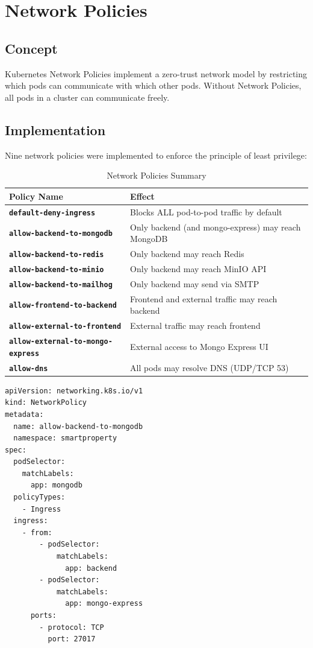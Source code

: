 \documentclass[12pt,a4paper]{report}
\begin{document}
\section{Network Policies}

\subsection{Concept}

Kubernetes Network Policies implement a zero-trust network model by restricting which pods can communicate with which other pods. Without Network Policies, all pods in a cluster can communicate freely.

\subsection{Implementation}

Nine network policies were implemented to enforce the principle of least privilege:

\begin{table}[H]
  \centering
  \begin{tabular}{>{\bfseries}p{5.5cm} p{8cm}}
    \toprule
    \textbf{Policy Name} & \textbf{Effect} \\
    \midrule
    \texttt{default-deny-ingress} & Blocks ALL pod-to-pod traffic by default \\
    \texttt{allow-backend-to-mongodb} & Only backend (and mongo-express) may reach MongoDB \\
    \texttt{allow-backend-to-redis} & Only backend may reach Redis \\
    \texttt{allow-backend-to-minio} & Only backend may reach MinIO API \\
    \texttt{allow-backend-to-mailhog} & Only backend may send via SMTP \\
    \texttt{allow-frontend-to-backend} & Frontend and external traffic may reach backend \\
    \texttt{allow-external-to-frontend} & External traffic may reach frontend \\
    \texttt{allow-external-to-mongo-express} & External access to Mongo Express UI \\
    \texttt{allow-dns} & All pods may resolve DNS (UDP/TCP 53) \\
    \bottomrule
  \end{tabular}
  \caption{Network Policies Summary}
\end{table}

\begin{lstlisting}[style=yamlstyle, caption={Example: MongoDB Network Policy}]
apiVersion: networking.k8s.io/v1
kind: NetworkPolicy
metadata:
  name: allow-backend-to-mongodb
  namespace: smartproperty
spec:
  podSelector:
    matchLabels:
      app: mongodb
  policyTypes:
    - Ingress
  ingress:
    - from:
        - podSelector:
            matchLabels:
              app: backend
        - podSelector:
            matchLabels:
              app: mongo-express
      ports:
        - protocol: TCP
          port: 27017
\end{lstlisting}
\end{document}
